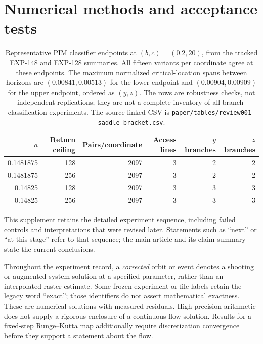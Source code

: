 \section{Numerical methods and acceptance tests}
\label{supp:methods}

\begin{table}[tbp]
\centering
\small
\begin{tabular}{@{}rrrrrr@{}}
\toprule
$a$ & Return ceiling & Pairs/coordinate & Access lines & $y$ branches & $z$ branches \\
\midrule
0.1481875 & 128 & 2097 & 3 & 2 & 2 \\
0.1481875 & 256 & 2097 & 3 & 2 & 2 \\
0.14825 & 128 & 2097 & 3 & 3 & 3 \\
0.14825 & 256 & 2097 & 3 & 3 & 3 \\
\bottomrule
\end{tabular}
\caption{Representative PIM classifier endpoints at $(b,c)=(0.2,20)$,
from the tracked EXP-148 and EXP-128 summaries. All fifteen variants per
coordinate agree at these endpoints. The maximum normalized critical-location
spans between horizons are $(0.00841,0.00513)$ for the lower endpoint and
$(0.00904,0.00909)$ for the upper endpoint, ordered as $(y,z)$.
The rows are robustness checks, not independent replications; they are not
a complete inventory of all branch-classification experiments.
The source-linked CSV is \texttt{paper/tables/review001-saddle-bracket.csv}.}
\label{tab:saddle-endpoints}
\end{table}

This supplement retains the detailed experiment sequence, including failed
controls and interpretations that were revised later.  Statements such as
``next'' or ``at this stage'' refer to that sequence; the main article and
its claim summary state the current conclusions.


Throughout the experiment record, a \emph{corrected} orbit or event denotes a
shooting or augmented-system solution at a specified parameter, rather than an
interpolated raster estimate. Some frozen experiment or file labels retain the
legacy word ``exact''; those identifiers do not assert mathematical exactness.
These are numerical solutions with measured residuals. High-precision
arithmetic does not supply a rigorous enclosure of a continuous-flow solution.
Results for a fixed-step Runge--Kutta map additionally require discretization
convergence before they support a statement about the flow.

